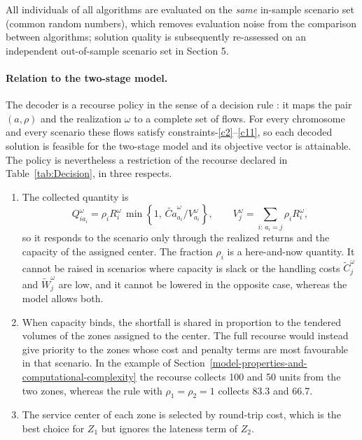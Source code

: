 \documentclass[11pt, a4paper]{article}
\begin{document}
All individuals of all algorithms are evaluated on the \emph{same}
in-sample scenario set (common random numbers), which removes evaluation
noise from the comparison between algorithms; solution quality is
subsequently re-assessed on an independent out-of-sample scenario set in
Section 5.

\paragraph{Relation to the two-stage model.} The decoder is a recourse policy in the sense of a decision rule \citep{bental2004adjustable, kuhn2011primal}: it maps the pair $(a,\rho)$ and the realization $\omega$ to a complete set of flows. For every chromosome and every scenario these flows satisfy constraints-\eqref{c2}--\eqref{c11}, so each decoded solution is feasible for the two-stage model and its objective vector is attainable. The policy is nevertheless a restriction of the recourse declared in Table~\ref{tab:Decision}, in three respects.
\begin{enumerate}
\item The collected quantity is
\begin{equation}
Q_{i a_i}^{\omega} = \rho_i R_i^{\omega}\,\min\!\left\{1,\, \widetilde{Ca}_{a_i}^{\omega} \big/ V_{a_i}^{\omega}\right\},
\qquad V_j^{\omega} = \sum_{i:\, a_i = j} \rho_i R_i^{\omega},
\label{eq:policy}\tag{4.1.1}
\end{equation}
so it responds to the scenario only through the realized returns and the capacity of the assigned center. The fraction $\rho_i$ is a here-and-now quantity. It cannot be raised in scenarios where capacity is slack or the handling costs $\widetilde{C}_j^{\omega}$ and $\widetilde{W}_j^{\omega}$ are low, and it cannot be lowered in the opposite case, whereas the model allows both.
\item When capacity binds, the shortfall is shared in proportion to the tendered volumes of the zones assigned to the center. The full recourse would instead give priority to the zones whose cost and penalty terms are most favourable in that scenario. In the example of Section~\ref{model-properties-and-computational-complexity} the recourse collects 100 and 50 units from the two zones, whereas the rule with $\rho_1=\rho_2=1$ collects 83.3 and 66.7.
\item The service center of each zone is selected by round-trip cost, which is the best choice for $Z_1$ but ignores the lateness term of $Z_2$.
\end{enumerate}
\end{document}
